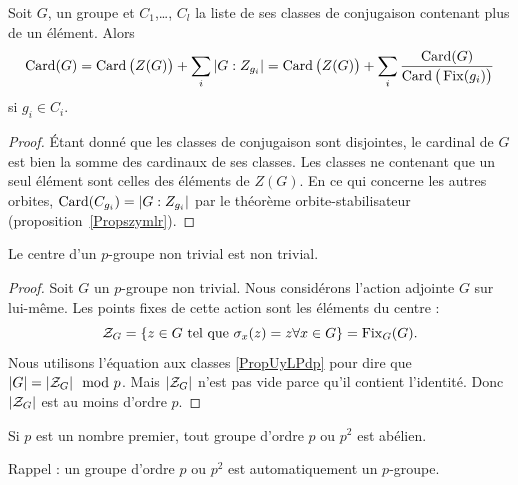 \begin{corollary}
    Soit \( G\), un groupe et \( C_1\),\ldots, \( C_l\) la liste de ses classes de conjugaison contenant plus de un élément. Alors
    \begin{equation}        \label{EqkgGmoq}
        \operatorname{Card}(G)=\operatorname{Card}\big( Z(G) \big)+\sum_i| G:Z_{g_i} |=\operatorname{Card}\big( Z(G) \big)+\sum_i\frac{ \operatorname{Card}(G) }{ \operatorname{Card}\big( \operatorname{Fix}(g_i) \big) }
    \end{equation}
    si \( g_i\in C_i\).
\end{corollary}

\begin{proof}
    Étant donné que les classes de conjugaison sont disjointes, le cardinal de \( G\) est bien la somme des cardinaux de ses classes. Les classes ne contenant que un seul élément sont celles des éléments de \( Z(G)\). En ce qui concerne les autres orbites, \( \operatorname{Card}(C_{g_i})=| G:Z_{g_i} |\) par le théorème orbite-stabilisateur (proposition~\ref{Propszymlr}).
\end{proof}



\begin{theorem} \label{ThoImkljy}
    Le centre d'un \( p\)-groupe non trivial est non trivial.
\end{theorem}

\begin{proof}
    Soit \( G\) un $p$-groupe non trivial. Nous considérons l'action adjointe \( G\) sur lui-même. Les points fixes de cette action sont les éléments du centre :
    \begin{equation}
        \mathcal{Z}_G=\{ z\in G\text{ tel que } \sigma_x(z)=z\forall x\in G \}=\operatorname{Fix}_G(G).
    \end{equation}
    Nous utilisons l'équation aux classes \eqref{PropUyLPdp} pour dire que \( | G |=| \mathcal{Z}_G |\mod p\). Mais \( | \mathcal{Z}_G |\) n'est pas vide parce qu'il contient l'identité. Donc \( | \mathcal{Z}_G |\) est au moins d'ordre \( p\).
\end{proof}

\begin{proposition} \label{PropssttFK}
    Si \( p\) est un nombre premier, tout groupe d'ordre \( p\) ou \( p^2\) est abélien.
\end{proposition}
Rappel : un groupe d'ordre \( p\) ou \( p^2\) est automatiquement un $p$-groupe.

